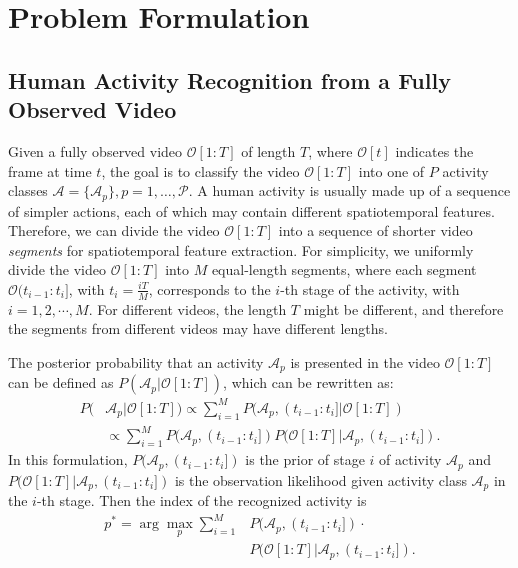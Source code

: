 \section{Problem Formulation}\label{sec:problem_formulation}

\subsection{Human Activity Recognition from a Fully Observed Video}
\label{sec:complete}
Given a fully observed video $\mathcal{O}[1:T]$ of length $T$, where
$\mathcal{O}[t]$ indicates the frame at time $t$, the goal is to classify the
video $\mathcal{O}[1:T]$ into one of $P$ activity classes $\mathcal{A} =
\{\mathcal{A}_p\}, p=1,\dots,\mathcal{P}$. A human activity is usually made up
of a sequence of simpler actions, each of which may contain different
spatiotemporal features.  Therefore, we can divide the video $\mathcal{O}[1:T]$
into a sequence of shorter video \textit{segments} for spatiotemporal feature
extraction. For simplicity, we uniformly divide the video $\mathcal{O}[1:T]$
into $M$ equal-length segments, where each segment $\mathcal{O}(t_{i-1}:t_i]$,
with $t_i=\frac{iT}{M}$, corresponds to the $i$-th stage of the activity, with
$i=1,2,\cdots, M$.  For different videos, the length $T$ might be different,
and therefore the segments from different videos may have different lengths.

The posterior probability that an activity $\mathcal{A}_p$ is presented in the
video $\mathcal{O}[1:T]$ can be defined as $P(\mathcal{A}_p |
\mathcal{O}[1:T])$, which can be rewritten as:
\begin{equation}
  \label{eq:full_observed_formulation}
  \begin{split}
    P(&\mathcal{A}_p | \mathcal{O}[1:T])\propto \sum_{i=1}^M P(\mathcal{A}_p, (t_{i-1}:t_i] | \mathcal{O}[1:T]) \\
    &\propto \sum_{i=1}^M P(\mathcal{A}_p, (t_{i-1}:t_i])P(\mathcal{O}[1:T] | \mathcal{A}_p, (t_{i-1}:t_i]).
  \end{split}
\end{equation}
In this formulation, $P(\mathcal{A}_p, (t_{i-1}:t_i])$ is the prior of stage
$i$ of activity $\mathcal{A}_p$ and $P(\mathcal{O}[1:T] | \mathcal{A}_p,
(t_{i-1}:t_i])$ is the observation likelihood given activity class
$\mathcal{A}_p$ in the $i$-th stage. Then the index of the recognized activity
is
\begin{equation}
  \begin{split}
    p^* = \arg\max_p  \sum_{i=1}^M &P(\mathcal{A}_p, (t_{i-1}:t_i]) \cdot \\
    &P(\mathcal{O}[1:T] | \mathcal{A}_p, (t_{i-1}:t_i]).
  \end{split}
\end{equation}

